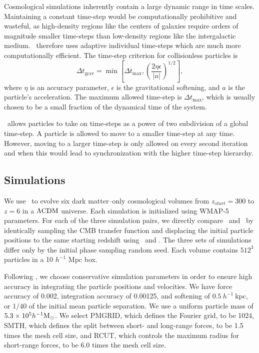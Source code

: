 Cosmological simulations inherently contain a large dynamic range in time scales.  Maintaining a constant time-step would be computationally prohibitive and wasteful, as high-density regions like the centers of galaxies require orders of magnitude smaller time-steps than low-density regions like the intergalactic medium.  \gadgettwo\ therefore uses adaptive individual time-steps which are much more computationally efficient.  The time-step criterion for collisionless particles is
\begin{equation}
	\Delta t_{\mathrm{grav}} = \min \left[ \Delta t_{\max}, \left( \frac{2 \eta \epsilon}{|a|} \right)^{1/2} \right],
\end{equation}
where $\eta$ is an accuracy parameter, $\epsilon$ is the gravitational softening, and $a$ is the particle's acceleration.  The maximum allowed time-step is $\Delta t_{\max}$, which is usually chosen to be a small fraction of the dynamical time of the system.

\gadgettwo\ allows particles to take on time-steps as a power of two subdivision of a global time-step.  A particle is allowed to move to a smaller time-step at any time.  However, moving to a larger time-step is only allowed on every second iteration and when this would lead to synchronization with the higher time-step hierarchy.




\subsection{Simulations}
\label{subsec:gadget--simulations}


We use \gadgettwo\ to evolve six dark matter--only cosmological volumes from $z_{start} = 300$ to $z = 6$ in a $\rm \Lambda CDM$ universe.  Each simulation is initialized using WMAP-5 \citep{2009ApJS..180..330K} parameters.  For each of the three simulation pairs, we directly compare \lpt\ and \za\ by identically sampling the CMB transfer function and displacing the initial particle positions to the same starting redshift using \lpt\ and \za.  The three sets of simulations differ only by the initial phase sampling random seed.  Each volume contains $512^{3}$ particles in a 10 $h^{-1}$ Mpc box.

Following \citet{2010ApJ...715..104H}, we choose conservative simulation parameters in order to ensure high accuracy in integrating the particle positions and velocities.  We have force accuracy of 0.002, integration accuracy of 0.00125, and softening of $0.5\ h^{-1}\ \mathrm{kpc}$, or $1 / 40$ of the initial mean particle separation.  We use a uniform particle mass of $5.3 \times 10^{5} h^{-1} {\rm M_\odot}$.  We select PMGRID, which defines the Fourier grid, to be 1024, SMTH, which defines the split between short- and long-range forces, to be 1.5 times the mesh cell size, and RCUT, which controls the maximum radius for short-range forces, to be 6.0 times the mesh cell size.





